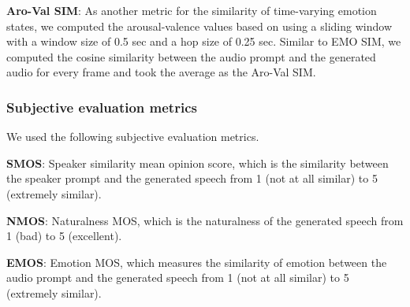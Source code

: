 \textbf{Aro-Val SIM}: As another metric for the similarity of time-varying emotion states, we computed the arousal-valence values based on \cite{wagner2023dawn} using a sliding window with a window size of 0.5 sec and a hop size of 0.25 sec. Similar to EMO SIM, we computed the cosine similarity between the audio prompt and the generated audio for every frame and took the average as the Aro-Val SIM.

\vspace{-.5em}
\subsubsection{Subjective evaluation metrics}
\vspace{-.5em}
We used the following subjective evaluation metrics.

\textbf{SMOS}: Speaker similarity mean opinion score, which is the similarity between the speaker prompt and the generated speech from 1 (not at all similar) to 5 (extremely similar).
    
\textbf{NMOS}: Naturalness MOS, which is the naturalness of the generated speech from 1 (bad) to 5 (excellent).
    
\textbf{EMOS}: Emotion MOS, which measures the similarity of emotion between the audio prompt and the generated speech from 1 (not at all similar) to 5 (extremely similar).

